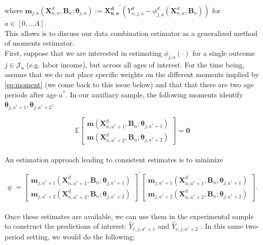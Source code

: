 \noindent where $\bm{m}_{j,a} \left( \bm{X}_{n,a}^d, \bm{B}_{n} ; \bm{\theta}_{j,a} \right) := {\bm{X_{n,a}^d}}^{'} \left( Y_{n,j,a}^d -   \phi^d_{j,a} \left( \bm{X}_{n,a}^d, \bm{B}_{n} \right) \right)$ for $a \in [0, \ldots A]$.\\

\noindent This allows is to discuss our data combination estimator as a generalized method of moments estimator.\\

\noindent First, suppose that we are interested in estimating $\phi_{j,a} \left( \cdot \right)$ for a single outcome $j \in \mathcal{J}_{a}$ (e.g. labor income), but across all ages of interest. For the time being, assume that we do not place specific weights on the different moments implied by \eqref{eq:moment} (we come back to this issue below) and that that there are two age periods after age $a^*$. In our auxiliary sample, the following moments identify $\bm{\theta}_{j,a^*+1}, \bm{\theta}_{j,a^*+2}$: 

\begin{equation}
\mathbb{E}
\begin{bmatrix}
\bm{m} \left( \bm{X}_{n,a^*+1}^d, \bm{B}_{n}; \bm{\theta}_{j,a^*+1} \right) \\ \bm{m} \left( \bm{X}_{n,a^*+2}^d, \bm{B}_{n}; \bm{\theta}_{j,a^*+2} \right) 
\end{bmatrix}
= \bm{0}
\end{equation}\\

\noindent An estimation approach leading to consistent estimates is to minimize

\begin{equation}
q : = 
{\begin{bmatrix}
\bm{m}_{j,a^*+1} \left( \bm{X}_{n,a^*+1}^d, \bm{B}_{n}; \bm{\theta}_{j,a^*+1} \right) \\ \bm{m}_{j,a^*+2} \left( \bm{X}_{n,a^*+2}^d, \bm{B}_{n}; \bm{\theta}_{j,a^*+2} \right) 
\end{bmatrix}}^{'}
\begin{bmatrix}
\bm{m}_{j,a^*+1} \left( \bm{X}_{n,a^*+1}^d, \bm{B}_{n}; \bm{\theta}_{j,a^*+1} \right) \\ \bm{m}_{j,a^*+2} \left( \bm{X}_{n,a^*+2}^d, \bm{B}_{n}; \bm{\theta}_{j,a^*+2} \right) 
\end{bmatrix}. 
\end{equation}\\

\noindent Once these estimates are available, we can use them in the experimental sample to construct the predictions of interest: $\hat{Y}_{e,j,a^*+1}$ and $\hat{Y}_{e,j,a^*+2}$ . In this same two-period setting, we would do the following: 

